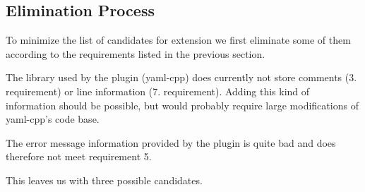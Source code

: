 \subsection{Elimination Process}

To minimize the list of candidates for extension we first eliminate some of them according to the requirements listed in the previous section.

\begin{description}[style=multiline, leftmargin=2cm, font=\bfseries]
  \item[YAML CPP] The library used by the plugin (yaml-cpp) does currently not store comments (3. requirement) or line information (7. requirement). Adding this kind of information should be possible, but would probably require large modifications of yaml-cpp’s code base.

  \item[YAy PEG] The error message information provided by the plugin is quite bad and does therefore not meet requirement 5.
\end{description}

This leaves us with three possible candidates.


